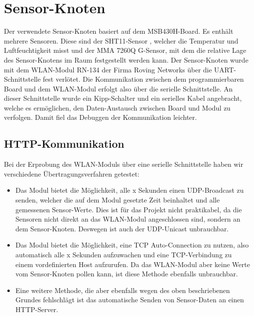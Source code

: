 \documentclass[12pt,a4paper,twoside]{article}
\begin{document}
\section{Sensor-Knoten}
Der verwendete Sensor-Knoten basiert auf dem MSB430H-Board. Es enthält mehrere Sensoren. Diese sind der SHT11-Sensor , welcher die Temperatur und Luftfeuchtigkeit misst und der MMA 7260Q G-Sensor, 
mit dem die relative Lage des Sensor-Knotens im Raum festgestellt werden kann. Der Sensor-Knoten wurde mit dem WLAN-Modul RN-134 der Firma Roving Networks über die UART-Schnittstelle fest verlötet. 
Die Kommunikation zwischen dem programmierbaren Board und dem WLAN-Modul erfolgt also über die serielle Schnittstelle. An dieser Schnittstelle wurde ein Kipp-Schalter und  ein serielles Kabel angebracht, 
welche es ermöglichen, den Daten-Austausch zwischen Board und Modul zu verfolgen. Damit fiel das Debuggen der Kommunikation leichter.

\subsection{HTTP-Kommunikation}
\label{ssec:HTTP}
Bei der Erprobung des WLAN-Moduls über eine serielle Schnittstelle haben wir verschiedene Übertragungsverfahren getestet: 

\begin{itemize}
 \item Das Modul bietet die Möglichkeit, alle x Sekunden einen UDP-Broadcast zu senden, welcher die auf dem Modul gesetzte Zeit beinhaltet und alle gemessenen Sensor-Werte. Dies ist für das Projekt nicht praktikabel, da die Sensoren nicht direkt an das WLAN-Modul angeschlossen sind, sondern an dem Sensor-Knoten. Deswegen ist auch der UDP-Unicast unbrauchbar.
 \item Das Modul bietet die Möglichkeit, eine TCP Auto-Connection zu nutzen, also automatisch alle x Sekunden aufzuwachen und eine TCP-Verbindung zu einem vordefinierten Host aufzurufen. Da das WLAN-Modul aber keine Werte vom Sensor-Knoten pollen kann, ist diese Methode ebenfalls unbrauchbar. 
 \item Eine weitere Methode, die aber ebenfalls wegen des oben beschriebenen Grundes fehlschlägt ist das automatische Senden von Sensor-Daten an einen HTTP-Server. 
\end{itemize}
\end{document}
